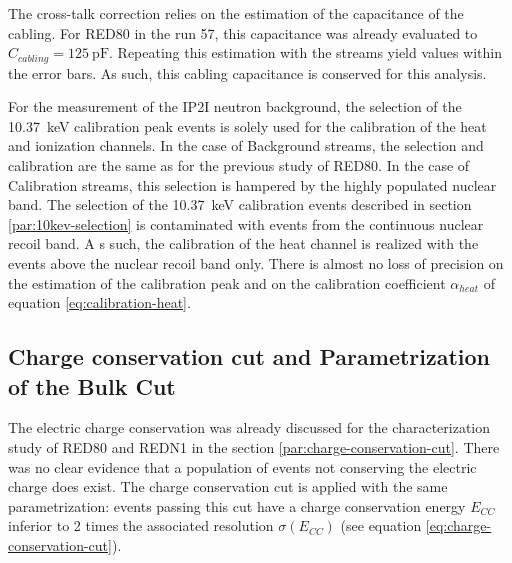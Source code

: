 The cross-talk correction relies on the estimation of the capacitance of the cabling. For RED80 in the run 57, this capacitance was already evaluated to  $C_{cabling} = \SI{125}{\pico\farad}$. Repeating this estimation with the streams yield values within the error bars. As such, this cabling capacitance is conserved for this analysis.

For the measurement of the IP2I neutron background, the selection of the \SI{10.37}{\kilo\eV} calibration peak events  is solely used for the calibration of the heat and ionization channels.
In the case of Background streams, the selection and calibration are the same as for the previous study of RED80.
In the case of Calibration streams, this selection is hampered by the highly populated nuclear band. The selection of the \SI{10.37}{\kilo\eV} calibration events described in section \ref{par:10kev-selection} is contaminated with events from the continuous nuclear recoil band. A s such, the calibration of the heat channel is realized with the events above the nuclear recoil band only. There is almost no loss of precision on the estimation of the calibration peak and on the calibration coefficient $\alpha_{heat}$ of equation \ref{eq:calibration-heat}. 


\subsection{Charge conservation cut and Parametrization of the Bulk Cut}

The electric charge conservation was already discussed for the characterization study of RED80 and REDN1 in the section \ref{par:charge-conservation-cut}. There was no clear evidence that a population of events not conserving the electric charge does exist. 
The charge conservation cut is applied with the same parametrization: events passing this cut have a charge conservation energy $E_{CC}$ inferior to 2 times the associated resolution $\sigma(E_{CC})$ (see equation \ref{eq:charge-conservation-cut}).


